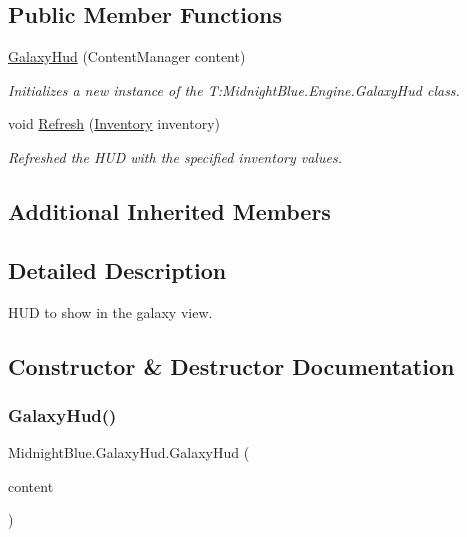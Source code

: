 \subsection*{Public Member Functions}
\begin{DoxyCompactItemize}
\item 
\hyperlink{class_midnight_blue_1_1_galaxy_hud_a6f15257e5bc5bbc67cac3888f075ea29}{Galaxy\+Hud} (Content\+Manager content)
\begin{DoxyCompactList}\small\item\em Initializes a new instance of the T\+:\+Midnight\+Blue.\+Engine.\+Galaxy\+Hud class. \end{DoxyCompactList}\item 
void \hyperlink{class_midnight_blue_1_1_galaxy_hud_aea2d04b212188a2e729ea327b7da0449}{Refresh} (\hyperlink{class_midnight_blue_1_1_engine_1_1_entity_component_1_1_inventory}{Inventory} inventory)
\begin{DoxyCompactList}\small\item\em Refreshed the H\+UD with the specified inventory values. \end{DoxyCompactList}\end{DoxyCompactItemize}
\subsection*{Additional Inherited Members}


\subsection{Detailed Description}
H\+UD to show in the galaxy view. 



\subsection{Constructor \& Destructor Documentation}
\hypertarget{class_midnight_blue_1_1_galaxy_hud_a6f15257e5bc5bbc67cac3888f075ea29}{}\label{class_midnight_blue_1_1_galaxy_hud_a6f15257e5bc5bbc67cac3888f075ea29} 
\subsubsection{\texorpdfstring{Galaxy\+Hud()}{GalaxyHud()}}
{\footnotesize\ttfamily Midnight\+Blue.\+Galaxy\+Hud.\+Galaxy\+Hud (\begin{DoxyParamCaption}\item[{Content\+Manager}]{content }\end{DoxyParamCaption})\hspace{0.3cm}{\ttfamily [inline]}}



